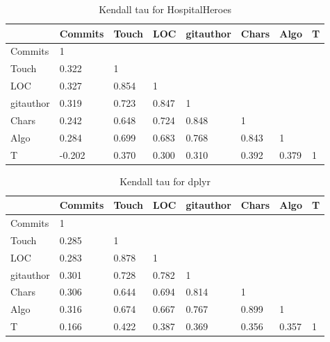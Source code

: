 \begin{table}[ht]
    \centering
    \begin{tabular}{l l l l l l l l}
         \hline
         & Commits & Touch & LOC & gitauthor & Chars &  Algo & T \\
         \hline
         Commits & 1 & & & & & & \\
         Touch & 0.322 & 1 & & & & & \\
         LOC & 0.327 & 0.854 & 1 & & & & \\
         gitauthor & 0.319 & 0.723 & 0.847 & 1 & & & \\
         Chars & 0.242 & 0.648 & 0.724 & 0.848 & 1 & & \\
         Algo & 0.284 & 0.699 & 0.683 & 0.768 & 0.843 & 1 & \\
         T & -0.202 & 0.370 & 0.300 & 0.310 & 0.392 & 0.379 & 1 \\
         \hline
    \end{tabular}
    \caption{Kendall tau for HospitalHeroes}
    \label{table:2}
\end{table}

\begin{table}[ht]
    \centering
    \begin{tabular}{l l l l l l l l}
         \hline
         & Commits & Touch & LOC & gitauthor & Chars &  Algo & T \\
         \hline
         Commits & 1 & & & & & & \\
         Touch & 0.285 & 1 & & & & & \\
         LOC & 0.283 & 0.878 & 1 & & & & \\
         gitauthor & 0.301 & 0.728 & 0.782 & 1 & & & \\
         Chars & 0.306 & 0.644 & 0.694 & 0.814 & 1 & & \\
         Algo & 0.316 & 0.674 & 0.667 & 0.767 & 0.899 & 1 & \\
         T & 0.166 & 0.422 & 0.387 & 0.369 & 0.356 & 0.357 & 1 \\
         \hline
    \end{tabular}
    \caption{Kendall tau for dplyr}
    \label{table:3}
\end{table}

